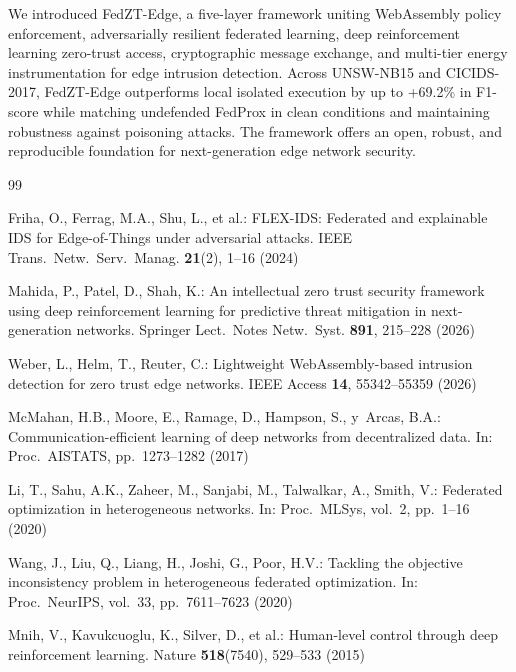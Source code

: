 \documentclass[iicol,sn-mathphys,Numbered]{sn-jnl}
\begin{document}
We introduced FedZT-Edge, a five-layer framework uniting WebAssembly policy enforcement, adversarially resilient federated learning, deep reinforcement learning zero-trust access, cryptographic message exchange, and multi-tier energy instrumentation for edge intrusion detection. Across UNSW-NB15 and CICIDS-2017, FedZT-Edge outperforms local isolated execution by up to +69.2\% in F1-score while matching undefended FedProx in clean conditions and maintaining robustness against poisoning attacks. The framework offers an open, robust, and reproducible foundation for next-generation edge network security.

\begin{thebibliography}{99}

Friha, O., Ferrag, M.A., Shu, L., et al.:
FLEX-IDS: Federated and explainable IDS for Edge-of-Things under adversarial attacks.
IEEE Trans.\ Netw.\ Serv.\ Manag. \textbf{21}(2), 1--16 (2024)

Mahida, P., Patel, D., Shah, K.:
An intellectual zero trust security framework using deep reinforcement learning for predictive threat mitigation in next-generation networks.
Springer Lect.\ Notes Netw.\ Syst. \textbf{891}, 215--228 (2026)

Weber, L., Helm, T., Reuter, C.:
Lightweight WebAssembly-based intrusion detection for zero trust edge networks.
IEEE Access \textbf{14}, 55342--55359 (2026)

McMahan, H.B., Moore, E., Ramage, D., Hampson, S., y~Arcas, B.A.:
Communication-efficient learning of deep networks from decentralized data.
In: Proc.\ AISTATS, pp.\ 1273--1282 (2017)

Li, T., Sahu, A.K., Zaheer, M., Sanjabi, M., Talwalkar, A., Smith, V.:
Federated optimization in heterogeneous networks.
In: Proc.\ MLSys, vol.~2, pp.\ 1--16 (2020)

Wang, J., Liu, Q., Liang, H., Joshi, G., Poor, H.V.:
Tackling the objective inconsistency problem in heterogeneous federated optimization.
In: Proc.\ NeurIPS, vol.~33, pp.\ 7611--7623 (2020)

Mnih, V., Kavukcuoglu, K., Silver, D., et al.:
Human-level control through deep reinforcement learning.
Nature \textbf{518}(7540), 529--533 (2015)


\end{thebibliography}
\end{document}
